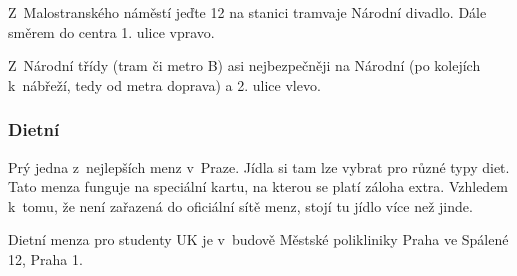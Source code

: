 Z~Malostranského náměstí jeďte 12 na stanici tramvaje Národní divadlo. Dále směrem do centra 1. ulice vpravo.

Z~Národní třídy (tram či metro B) asi nejbezpečněji na Národní (po kolejích k~nábřeží, tedy od metra doprava) a 2. ulice vlevo.

\subsubsection{Dietní} 

Prý jedna z~nejlepších menz v~Praze. Jídla si tam
lze vybrat pro různé typy diet. Tato menza funguje na speciální kartu, na kterou se platí záloha extra. Vzhledem k~tomu,
že není zařazená do oficiální sítě menz, stojí tu jídlo více než
jinde.

Dietní menza pro studenty UK je v~budově Městské polikliniky Praha ve Spálené 12, Praha 1.
